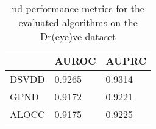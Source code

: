 \begin{table}
\caption{\gls{nd} performance metrics for the evaluated algorithms on the Dr(eye)ve dataset}
\label{tab:results dreyeve}
\begin{tabular}{|l|l|l|}
\hline
      & AUROC & AUPRC \\ \hline
DSVDD & 0.9265  & 0.9314  \\ \hline
GPND & 0.9172  & 0.9221  \\ \hline
ALOCC & 0.9175  & 0.9225  \\ \hline
\end{tabular}
\end{table}
